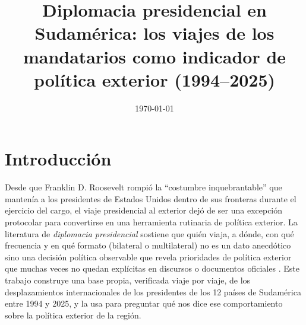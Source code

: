 \documentclass[11pt,a4paper]{article}
\title{Diplomacia presidencial en Sudam\'erica: los viajes de los mandatarios como indicador de pol\'itica exterior (1994--2025)}
\author{}
\date{\today}
\begin{document}

\maketitle

\begin{abstract}
\end{abstract}


\section{Introducci\'on}

Desde que Franklin D. Roosevelt rompi\'o la ``costumbre inquebrantable'' que manten\'ia a los presidentes de Estados Unidos dentro de sus fronteras durante el ejercicio del cargo, el viaje presidencial al exterior dej\'o de ser una excepci\'on protocolar para convertirse en una herramienta rutinaria de pol\'itica exterior. La literatura de \emph{diplomacia presidencial} sostiene que qui\'en viaja, a d\'onde, con qu\'e frecuencia y en qu\'e formato (bilateral o multilateral) no es un dato anecd\'otico sino una decisi\'on pol\'itica observable que revela prioridades de pol\'itica exterior que muchas veces no quedan expl\'icitas en discursos o documentos oficiales \citep{moyerWhenHeadsGovernment2025, ostranderPresidentsAbroadPolitics2018, balciHighLevelLeaderVisits2025}. Este trabajo construye una base propia, verificada viaje por viaje, de los desplazamientos internacionales de los presidentes de los 12 pa\'ises de Sudam\'erica entre 1994 y 2025, y la usa para preguntar qu\'e nos dice ese comportamiento sobre la pol\'itica exterior de la regi\'on.
\end{document}
